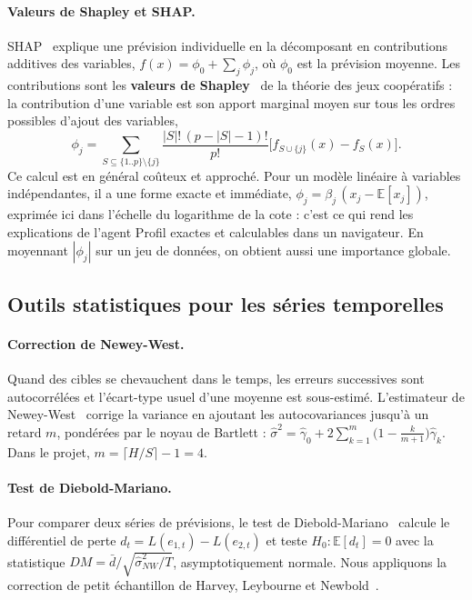 \paragraph{Valeurs de Shapley et SHAP.} SHAP~\cite{lundberg2017} explique une prévision individuelle en la décomposant en contributions additives des variables, $f(x) = \phi_0 + \sum_j \phi_j$, où $\phi_0$ est la prévision moyenne. Les contributions sont les \textbf{valeurs de Shapley}~\cite{shapley1953} de la théorie des jeux coopératifs : la contribution d'une variable est son apport marginal moyen sur tous les ordres possibles d'ajout des variables,
\begin{equation}
  \phi_j = \sum_{S \subseteq \{1..p\}\setminus\{j\}} \frac{|S|!\,(p-|S|-1)!}{p!}\Big[f_{S\cup\{j\}}(x) - f_S(x)\Big].
\end{equation}
Ce calcul est en général coûteux et approché. Pour un modèle linéaire à variables indépendantes, il a une forme exacte et immédiate, $\phi_j = \beta_j\,(x_j - \mathbb{E}[x_j])$, exprimée ici dans l'échelle du logarithme de la cote : c'est ce qui rend les explications de l'agent Profil exactes et calculables dans un navigateur. En moyennant $|\phi_j|$ sur un jeu de données, on obtient aussi une importance globale.

\subsection{Outils statistiques pour les séries temporelles}

\paragraph{Correction de Newey-West.} Quand des cibles se chevauchent dans le temps, les erreurs successives sont autocorrélées et l'écart-type usuel d'une moyenne est sous-estimé. L'estimateur de Newey-West~\cite{newey1987} corrige la variance en ajoutant les autocovariances jusqu'à un retard $m$, pondérées par le noyau de Bartlett : $\hat\sigma^2 = \hat\gamma_0 + 2\sum_{k=1}^{m}\big(1 - \frac{k}{m+1}\big)\hat\gamma_k$. Dans le projet, $m = \lceil H/S\rceil - 1 = 4$.

\paragraph{Test de Diebold-Mariano.} Pour comparer deux séries de prévisions, le test de Diebold-Mariano~\cite{diebold1995} calcule le différentiel de perte $d_t = L(e_{1,t}) - L(e_{2,t})$ et teste $H_0 : \mathbb{E}[d_t] = 0$ avec la statistique $DM = \bar d / \sqrt{\hat\sigma^2_{NW}/T}$, asymptotiquement normale. Nous appliquons la correction de petit échantillon de Harvey, Leybourne et Newbold~\cite{harvey1997}.

